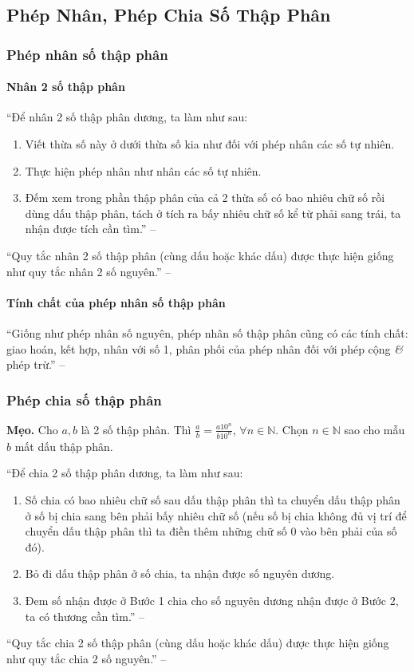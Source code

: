 \documentclass{article}
\numberwithin{equation}{section}
\begin{document}
\subsection{Phép Nhân, Phép Chia Số Thập Phân}

\subsubsection{Phép nhân số thập phân}

\paragraph{Nhân 2 số thập phân}
``Để nhân 2 số thập phân dương, ta làm như sau:
\begin{enumerate}
	\item Viết thừa số này ở dưới thừa số kia như đối với phép nhân các số tự nhiên.
	\item Thực hiện phép nhân như nhân các số tự nhiên.
	\item Đếm xem trong phần thập phân của cả 2 thừa số có bao nhiêu chữ số rồi dùng dấu thập phân, tách ở tích ra bấy nhiêu chữ số kể từ phải sang trái, ta nhận được tích cần tìm.'' -- \cite[p. 52]{SGK_Toan_6_Canh_Dieu_tap_2}
\end{enumerate}
``Quy tắc nhân 2 số thập phân (cùng dấu hoặc khác dấu) được thực hiện giống như quy tắc nhân 2 số nguyên.'' -- \cite[p. 52]{SGK_Toan_6_Canh_Dieu_tap_2}

\paragraph{Tính chất của phép nhân số thập phân}
``Giống như phép nhân số nguyên, phép nhân số thập phân cũng có các tính chất: giao hoán, kết hợp, nhân với số 1, phân phối của phép nhân đối với phép cộng \textit{\&} phép trừ.'' -- \cite[p. 53]{SGK_Toan_6_Canh_Dieu_tap_2}

\subsubsection{Phép chia số thập phân}
\textbf{Mẹo.} Cho $a,b$ là 2 số thập phân. Thì $\frac{a}{b} = \frac{a10^n}{b10^n}$, $\forall n\in\mathbb{N}$. Chọn $n\in\mathbb{N}$ sao cho mẫu $b$ mất dấu thập phân.

``Để chia 2 số thập phân dương, ta làm như sau:
\begin{enumerate}
	\item Số chia có bao nhiêu chữ số sau dấu thập phân thì ta chuyển dấu thập phân ở số bị chia sang bên phải bấy nhiêu chữ số (nếu số bị chia không đủ vị trí để chuyển dấu thập phân thì ta điền thêm những chữ số 0 vào bên phải của số đó).
	\item Bỏ đi dấu thập phân ở số chia, ta nhận được số nguyên dương.
	\item Đem số nhận được ở Bước 1 chia cho số nguyên dương nhận được ở Bước 2, ta có thương cần tìm.'' -- \cite[p. 54]{SGK_Toan_6_Canh_Dieu_tap_2}
\end{enumerate}
``Quy tắc chia 2 số thập phân (cùng dấu hoặc khác dấu) được thực hiện giống như quy tắc chia 2 số nguyên.'' -- \cite[p. 55]{SGK_Toan_6_Canh_Dieu_tap_2}
\end{document}
